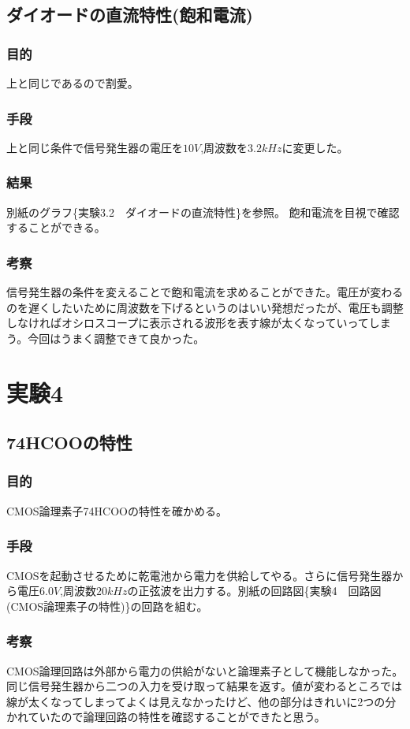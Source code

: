 \documentclass{jsarticle}
\begin{document}
\subsection{ダイオードの直流特性(飽和電流)}
\subsubsection{目的}
上と同じであるので割愛。
\subsubsection{手段}
上と同じ条件で信号発生器の電圧を$10V$,周波数を$3.2kHz$に変更した。
\subsubsection{結果}
別紙のグラフ\{実験3.2　ダイオードの直流特性\}を参照。
飽和電流を目視で確認することができる。
\subsubsection{考察}
信号発生器の条件を変えることで飽和電流を求めることができた。電圧が変わるのを遅くしたいために周波数を下げるというのはいい発想だったが、電圧も調整しなければオシロスコープに表示される波形を表す線が太くなっていってしまう。今回はうまく調整できて良かった。

\section{実験4}
\subsection{74HCOOの特性}
\subsubsection{目的}
CMOS論理素子74HCOOの特性を確かめる。
\subsubsection{手段}
CMOSを起動させるために乾電池から電力を供給してやる。さらに信号発生器から電圧$6.0V$,周波数$20kHz$の正弦波を出力する。別紙の回路図\{実験4　回路図(CMOS論理素子の特性)\}の回路を組む。
\subsubsection{考察}
CMOS論理回路は外部から電力の供給がないと論理素子として機能しなかった。同じ信号発生器から二つの入力を受け取って結果を返す。値が変わるところでは線が太くなってしまってよくは見えなかったけど、他の部分はきれいに2つの分かれていたので論理回路の特性を確認することができたと思う。
\end{document}
